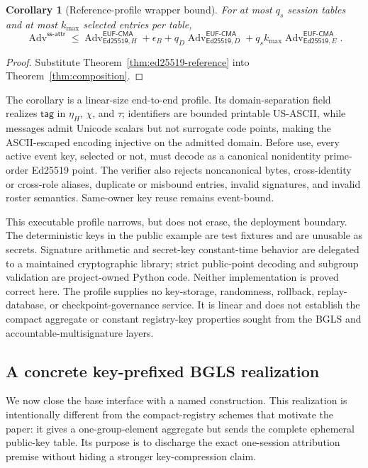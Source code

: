 \documentclass[11pt]{article}
\newtheorem{corollary}[theorem]{Corollary}
\theoremstyle{definition}
\begin{document}
\begin{corollary}[Reference-profile wrapper bound]\label{cor:ed25519-composition}
For at most $q_s$ session tables and at most $k_{\max}$ selected entries per table,
\[
 \operatorname{Adv}^{\mathsf{ss\mbox{-}attr}}
 \leq \operatorname{Adv}^{\mathsf{EUF\mbox{-}CMA}}_{\mathsf{Ed25519},H}
      +\epsilon_B
      +q_D\operatorname{Adv}^{\mathsf{EUF\mbox{-}CMA}}_{\mathsf{Ed25519},D}
      +q_s k_{\max}\operatorname{Adv}^{\mathsf{EUF\mbox{-}CMA}}_{\mathsf{Ed25519},E}.
\]
\end{corollary}
\begin{proof}
Substitute Theorem~\ref{thm:ed25519-reference} into Theorem~\ref{thm:composition}.
\end{proof}

The corollary is a linear-size end-to-end profile.  Its domain-separation field realizes $\mathsf{tag}$ in $\eta_H$, $\chi$, and $\tau$; identifiers are bounded printable US-ASCII, while messages admit Unicode scalars but not surrogate code points, making the ASCII-escaped encoding injective on the admitted domain.  Before use, every active event key, selected or not, must decode as a canonical nonidentity prime-order Ed25519 point.  The verifier also rejects noncanonical bytes, cross-identity or cross-role aliases, duplicate or misbound entries, invalid signatures, and invalid roster semantics.  Same-owner key reuse remains event-bound.

This executable profile narrows, but does not erase, the deployment boundary.  The deterministic keys in the public example are test fixtures and are unusable as secrets.  Signature arithmetic and secret-key constant-time behavior are delegated to a maintained cryptographic library; strict public-point decoding and subgroup validation are project-owned Python code. Neither implementation is proved correct here. The profile supplies no key-storage, randomness, rollback, replay-database, or checkpoint-governance service. It is linear and does not establish the compact aggregate or constant registry-key properties sought from the BGLS and accountable-multisignature layers.

\subsection{A concrete key-prefixed BGLS realization}\label{subsec:bgls-realization}
We now close the base interface with a named construction.  This realization is intentionally different from the compact-registry schemes that motivate the paper: it gives a one-group-element aggregate but sends the complete ephemeral public-key table.  Its purpose is to discharge the exact one-session attribution premise without hiding a stronger key-compression claim.
\end{document}
